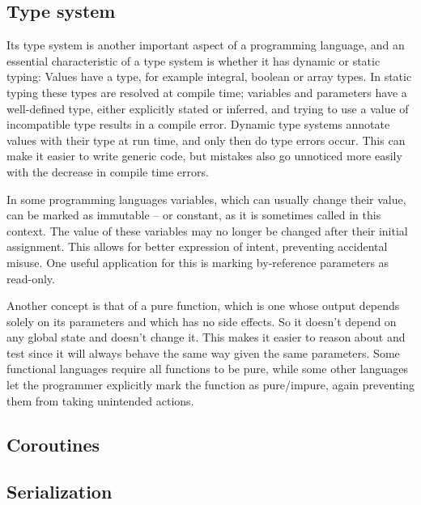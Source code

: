 		\subsection{Type system}
		Its type system is another important aspect of a programming language, and an essential characteristic of a type system is whether it has dynamic or static typing: Values have a type, for example integral, boolean or array types. In static typing these types are resolved at compile time; variables and parameters have a well-defined type, either explicitly stated or inferred, and trying to use a value of incompatible type results in a compile error.
		Dynamic type systems annotate values with their type at run time, and only then do type errors occur. This can make it easier to write generic code, but mistakes also go unnoticed more easily with the decrease in compile time errors.
		
		In some programming languages variables, which can usually change their value, can be marked as immutable -- or constant, as it is sometimes called in this context. The value of these variables may no longer be changed after their initial assignment. This allows for better expression of intent, preventing accidental misuse. One useful application for this is marking by-reference parameters as read-only.
		
		Another concept is that of a pure function, which is one whose output depends solely on its parameters and which has no side effects. So it doesn't depend on any global state and doesn't change it. This makes it easier to reason about and test since it will always behave the same way given the same parameters. Some functional languages require all functions to be pure, while some other languages let the programmer explicitly mark the function as pure/impure, again preventing them from taking unintended actions.
		
		\subsection{Coroutines}
		
		
		\subsection{Serialization}
		
	
